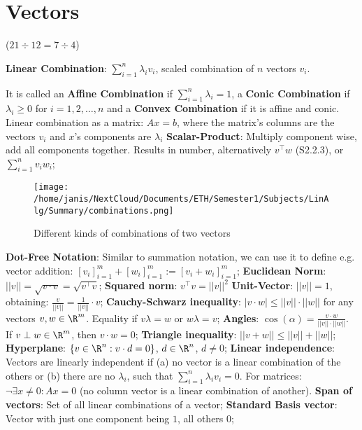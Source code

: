 \newsectionNoPB
\section{Vectors}
\label{sec:vectors}
 ($21 \div 12 = 7 \div 4$)

\setcounter{all}{4}
\shortdef \textbf{Linear Combination}: $\sum_{i=1}^{n} \lambda_i v_i$, scaled combination of $n$ vectors $v_i$. 

\setcounter{all}{7}
\shortdef It is called an \textbf{Affine Combination} if $\sum_{i=1}^{n} \lambda_i = 1$, a \textbf{Conic Combination} if $\lambda_i \geq 0$ for $i = 1, 2, \ldots, n$ and a \textbf{Convex Combination} if it is affine and conic. Linear combination as a matrix: $Ax = b$, where the matrix's columns are the vectors $v_i$ and $x$'s components are $\lambda_i$
%
\setcounter{all}{9}
\shortdef \textbf{Scalar-Product}: Multiply component wise, add all components together. Results in number, alternatively $v^{\top}w$ (S2.2.3), or $\sum_{i = 1}^{n} v_i w_i$;

\begin{wrapfigure}[10]{l}{0.5\textwidth}
    \texttt{[image: /home/janis/NextCloud/Documents/ETH/Semester1/Subjects/LinAlg/Summary/combinations.png]}
    \caption{Different kinds of combinations of two vectors}\label{fig:combinations}
\end{wrapfigure}

\textbf{Dot-Free Notation}: Similar to summation notation, we can use it to define e.g. vector addition: $[v_i]_{i=1}^{m} + [w_i]_{i=1}^{m} := [v_i + w_i]_{i=1}^{m}$;
\setcounter{all}{11}\shortdef \textbf{Euclidean Norm}: $||v|| = \sqrt{v \cdot v} = \sqrt{v^{\top}v}$;
\textbf{Squared norm}: $v^{\top}v = ||v||^2$
\textbf{Unit-Vector}: $||v|| = 1$, obtaining: $\frac{v}{||v||} = \frac{1}{||v||} \cdot v$;
\shortlemma \textbf{Cauchy-Schwarz inequality}: $|v \cdot w| \leq ||v|| \cdot ||w||$ for any vectors $v, w \in \R^m$. Equality if $v\lambda = w$ or $w\lambda = v$;
\setcounter{all}{14}\shortdef \textbf{Angles}: $\cos(\alpha) = \frac{v \cdot w}{||v|| \cdot ||w||}$. If $v \perp w \in \R^m$, then $v \cdot w = 0$;
\setcounter{all}{16}\shortlemma \textbf{Triangle inequality}: $||v + w|| \leq ||v|| + ||w||$;
\textbf{Hyperplane}: $\{v \in \R^n : v \cdot d = 0\}$, $d \in \R^n$, $d \neq 0$;
\setcounter{all}{19}\shortlemma \textbf{Linear independence}: Vectors are linearly independent if (a) no vector is a linear combination of the others or (b) there are no $\lambda_i$, such that $\sum_{i = 1}^{n} \lambda_i v_i = 0$. For matrices: $\neg \exists x \neq 0 : Ax = 0$ (no column vector is a linear combination of another).
\setcounter{all}{22}\shortdef \textbf{Span of vectors}: Set of all linear combinations of a vector;
\textbf{Standard Basis vector}: Vector with just one component being $1$, all others $0$;



